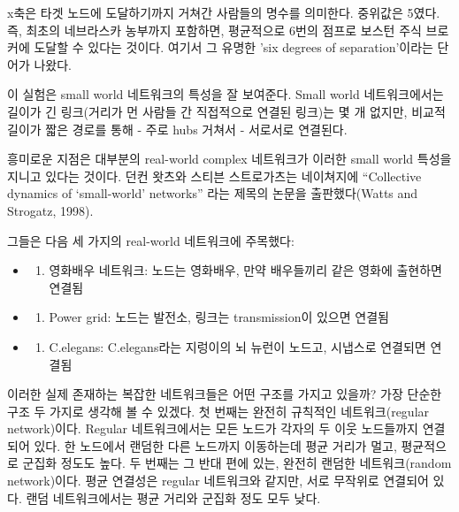 \documentclass[
]{book}
\providecommand{\tightlist}{%
  \setlength{\itemsep}{0pt}\setlength{\parskip}{0pt}}
\begin{document}
x축은 타겟 노드에 도달하기까지 거쳐간 사람들의 명수를 의미한다. 중위값은 5였다. 즉, 최초의 네브라스카 농부까지 포함하면, 평균적으로 6번의 점프로 보스턴 주식 브로커에 도달할 수 있다는 것이다. 여기서 그 유명한 'six degrees of separation'이라는 단어가 나왔다.

이 실험은 small world 네트워크의 특성을 잘 보여준다. Small world 네트워크에서는 길이가 긴 링크(거리가 먼 사람들 간 직접적으로 연결된 링크)는 몇 개 없지만, 비교적 길이가 짧은 경로를 통해 - 주로 hubs 거쳐서 - 서로서로 연결된다.

흥미로운 지점은 대부분의 real-world complex 네트워크가 이러한 small world 특성을 지니고 있다는 것이다. 던컨 왓츠와 스티븐 스트로가츠는 네이쳐지에 ``Collective dynamics of `small-world' networks'' 라는 제목의 논문을 출판했다(Watts and Strogatz, 1998).

그들은 다음 세 가지의 real-world 네트워크에 주목했다:

\begin{itemize}
\item
  \begin{enumerate}
  \def\labelenumi{(\arabic{enumi})}
  \tightlist
  \item
    영화배우 네트워크: 노드는 영화배우, 만약 배우들끼리 같은 영화에 출현하면 연결됨
  \end{enumerate}
\item
  \begin{enumerate}
  \def\labelenumi{(\arabic{enumi})}
  \setcounter{enumi}{1}
  \tightlist
  \item
    Power grid: 노드는 발전소, 링크는 transmission이 있으면 연결됨
  \end{enumerate}
\item
  \begin{enumerate}
  \def\labelenumi{(\arabic{enumi})}
  \setcounter{enumi}{2}
  \tightlist
  \item
    C.elegans: C.elegans라는 지렁이의 뇌 뉴런이 노드고, 시냅스로 연결되면 연결됨
  \end{enumerate}
\end{itemize}

이러한 실제 존재하는 복잡한 네트워크들은 어떤 구조를 가지고 있을까? 가장 단순한 구조 두 가지로 생각해 볼 수 있겠다. 첫 번째는 완전히 규칙적인 네트워크(regular network)이다. Regular 네트워크에서는 모든 노드가 각자의 두 이웃 노드들까지 연결되어 있다. 한 노드에서 랜덤한 다른 노드까지 이동하는데 평균 거리가 멀고, 평균적으로 군집화 정도도 높다. 두 번째는 그 반대 편에 있는, 완전히 랜덤한 네트워크(random network)이다. 평균 연결성은 regular 네트워크와 같지만, 서로 무작위로 연결되어 있다. 랜덤 네트워크에서는 평균 거리와 군집화 정도 모두 낮다.
\end{document}
